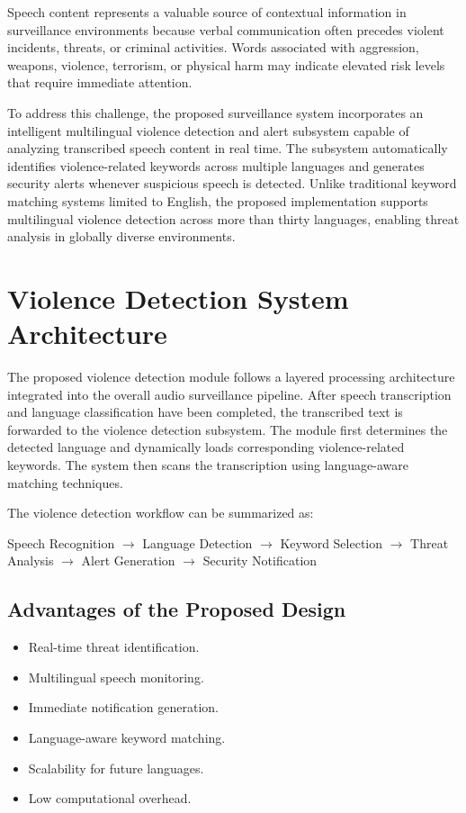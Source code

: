 \documentclass[12pt]{report}
\begin{document}
Speech content represents a valuable source of contextual information in surveillance environments because verbal communication often precedes violent incidents, threats, or criminal activities. Words associated with aggression, weapons, violence, terrorism, or physical harm may indicate elevated risk levels that require immediate attention.

To address this challenge, the proposed surveillance system incorporates an intelligent multilingual violence detection and alert subsystem capable of analyzing transcribed speech content in real time. The subsystem automatically identifies violence-related keywords across multiple languages and generates security alerts whenever suspicious speech is detected. Unlike traditional keyword matching systems limited to English, the proposed implementation supports multilingual violence detection across more than thirty languages, enabling threat analysis in globally diverse environments.

\section{Violence Detection System Architecture}

The proposed violence detection module follows a layered processing architecture integrated into the overall audio surveillance pipeline. After speech transcription and language classification have been completed, the transcribed text is forwarded to the violence detection subsystem. The module first determines the detected language and dynamically loads corresponding violence-related keywords. The system then scans the transcription using language-aware matching techniques.

The violence detection workflow can be summarized as:
\begin{center}
Speech Recognition $\rightarrow$ Language Detection $\rightarrow$ Keyword Selection $\rightarrow$ Threat Analysis $\rightarrow$ Alert Generation $\rightarrow$ Security Notification
\end{center}

\subsection{Advantages of the Proposed Design}
\begin{itemize}
    \item Real-time threat identification.
    \item Multilingual speech monitoring.
    \item Immediate notification generation.
    \item Language-aware keyword matching.
    \item Scalability for future languages.
    \item Low computational overhead.
\end{itemize}
\end{document}

